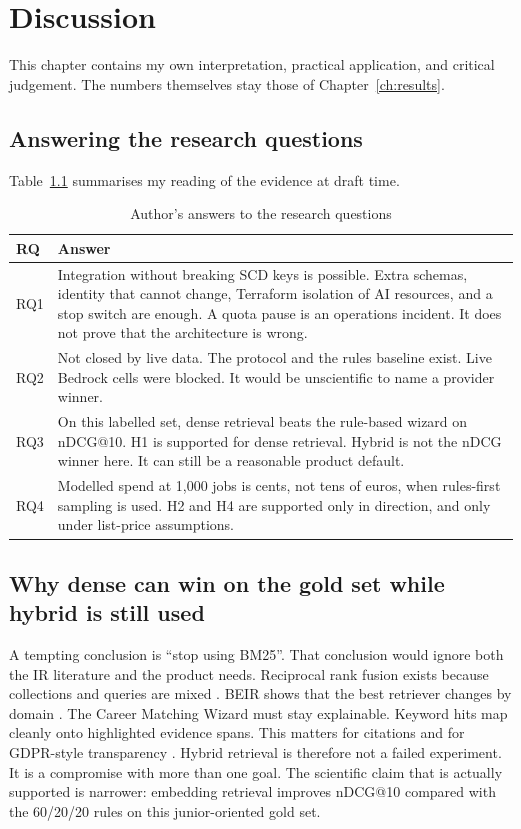 \chapter{Discussion}
\label{ch:discussion}

This chapter contains my own interpretation, practical application, and critical judgement. The numbers themselves stay those of Chapter~\ref{ch:results}.

\section{Answering the research questions}
\label{sec:answers}

Table~\ref{tab:rq-answers} summarises my reading of the evidence at draft time.

\begin{table}[ht]
\centering
\caption{Author's answers to the research questions}
\label{tab:rq-answers}
\begin{tabularx}{\textwidth}{@{}lX@{}}
\toprule
\textbf{RQ} & \textbf{Answer} \\
\midrule
RQ1 & Integration without breaking SCD keys is possible. Extra schemas, identity that cannot change, Terraform isolation of AI resources, and a stop switch are enough. A quota pause is an operations incident. It does not prove that the architecture is wrong. \\
RQ2 & Not closed by live data. The protocol and the rules baseline exist. Live Bedrock cells were blocked. It would be unscientific to name a provider winner. \\
RQ3 & On this labelled set, dense retrieval beats the rule-based wizard on nDCG@10. H1 is supported for dense retrieval. Hybrid is not the nDCG winner here. It can still be a reasonable product default. \\
RQ4 & Modelled spend at 1{,}000 jobs is cents, not tens of euros, when rules-first sampling is used. H2 and H4 are supported only in direction, and only under list-price assumptions. \\
\bottomrule
\end{tabularx}
\end{table}

\section{Why dense can win on the gold set while hybrid is still used}
\label{sec:dense-vs-hybrid}

A tempting conclusion is ``stop using BM25''. That conclusion would ignore both the IR literature and the product needs. Reciprocal rank fusion exists because collections and queries are mixed . BEIR shows that the best retriever changes by domain . The Career Matching Wizard must stay explainable. Keyword hits map cleanly onto highlighted evidence spans. This matters for citations and for GDPR-style transparency . Hybrid retrieval is therefore not a failed experiment. It is a compromise with more than one goal. The scientific claim that is actually supported is narrower: embedding retrieval improves nDCG@10 compared with the 60/20/20 rules on this junior-oriented gold set.

